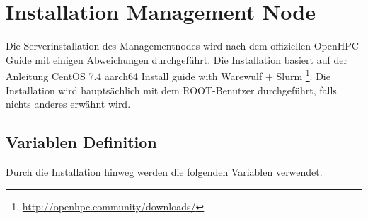 
\section{Installation Management Node}
Die Serverinstallation des Managementnodes wird nach dem offiziellen OpenHPC Guide mit einigen Abweichungen durchgeführt. Die Installation basiert auf der Anleitung CentOS 7.4 aarch64 Install guide with Warewulf + Slurm \footnote{\url{http://openhpc.community/downloads/}}. Die Installation wird hauptsächlich mit dem ROOT-Benutzer durchgeführt, falls nichts anderes erwähnt wird.

\subsection{Variablen Definition}
Durch die Installation hinweg werden die folgenden Variablen verwendet.

